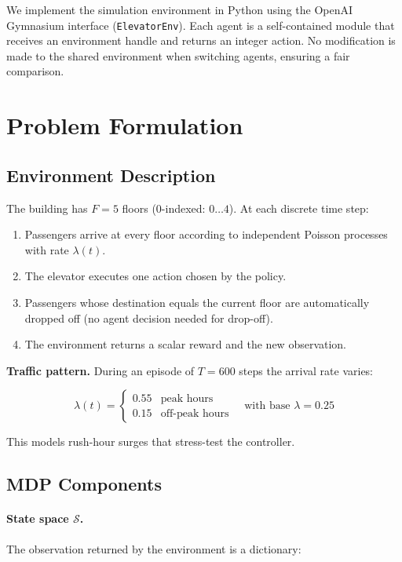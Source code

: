 \documentclass[12pt,a4paper]{article}
\begin{document}
We implement the simulation environment in Python using the OpenAI Gymnasium
interface (\texttt{ElevatorEnv}).  Each agent is a self-contained module that
receives an environment handle and returns an integer action.  No modification
is made to the shared environment when switching agents, ensuring a fair comparison.

\section{Problem Formulation}

\subsection{Environment Description}

The building has $F = 5$ floors (0-indexed: $0 \ldots 4$).
At each discrete time step:
\begin{enumerate}[leftmargin=2em]
    \item Passengers arrive at every floor according to independent Poisson
          processes with rate $\lambda(t)$.
    \item The elevator executes one action chosen by the policy.
    \item Passengers whose destination equals the current floor are automatically
          dropped off (no agent decision needed for drop-off).
    \item The environment returns a scalar reward and the new observation.
\end{enumerate}

\noindent\textbf{Traffic pattern.}
During an episode of $T = 600$ steps the arrival rate varies:

\[
\lambda(t) =
\begin{cases}
0.55 & \text{peak hours}\\
0.15 & \text{off-peak hours}
\end{cases}
\quad \text{with base } \lambda = 0.25
\]

This models rush-hour surges that stress-test the controller.

\subsection{MDP Components}

\paragraph{State space $\mathcal{S}$.}  The observation returned by the environment is
a dictionary:
\end{document}
